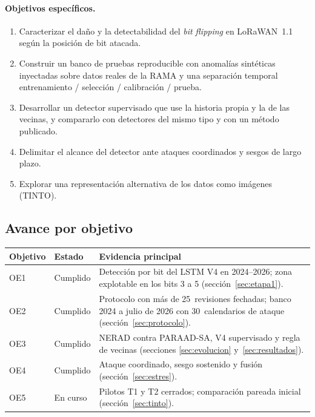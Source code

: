 \documentclass[11pt, letterpaper]{article}
\begin{document}
\paragraph{Objetivos específicos.}
\begin{enumerate}[label=OE\arabic*.]
  \item Caracterizar el daño y la detectabilidad del \emph{bit flipping} en LoRaWAN~1.1
    según la posición de bit atacada.
  \item Construir un banco de pruebas reproducible con anomalías sintéticas inyectadas
    sobre datos reales de la RAMA y una separación temporal entrenamiento / selección /
    calibración / prueba.
  \item Desarrollar un detector supervisado que use la historia propia y la de las
    vecinas, y compararlo con detectores del mismo tipo y con un método publicado.
  \item Delimitar el alcance del detector ante ataques coordinados y sesgos de largo plazo.
  \item Explorar una representación alternativa de los datos como imágenes (TINTO).
\end{enumerate}

\subsection{Avance por objetivo}

\begin{center}
\small
\renewcommand{\arraystretch}{1.25}
\begin{tabularx}{\linewidth}{@{}l l Y@{}}
  \toprule
  \textbf{Objetivo} & \textbf{Estado} & \textbf{Evidencia principal} \\
  \midrule
  OE1 & Cumplido & Detección por bit del LSTM V4 en 2024--2026; zona explotable en los
    bits 3 a 5 (sección~\ref{sec:etapa1}). \\
  OE2 & Cumplido & Protocolo con más de 25~revisiones fechadas; banco 2024 a julio de 2026
    con 30~calendarios de ataque (sección~\ref{sec:protocolo}). \\
  OE3 & Cumplido & NERAD contra PARAAD-SA, V4 supervisado y regla de vecinas
    (secciones \ref{sec:evolucion} y~\ref{sec:resultados}). \\
  OE4 & Cumplido & Ataque coordinado, sesgo sostenido y fusión
    (sección~\ref{sec:estres}). \\
  OE5 & En curso & Pilotos T1 y T2 cerrados; comparación pareada inicial
    (sección~\ref{sec:tinto}). \\
  \bottomrule
\end{tabularx}
\end{center}
\end{document}
